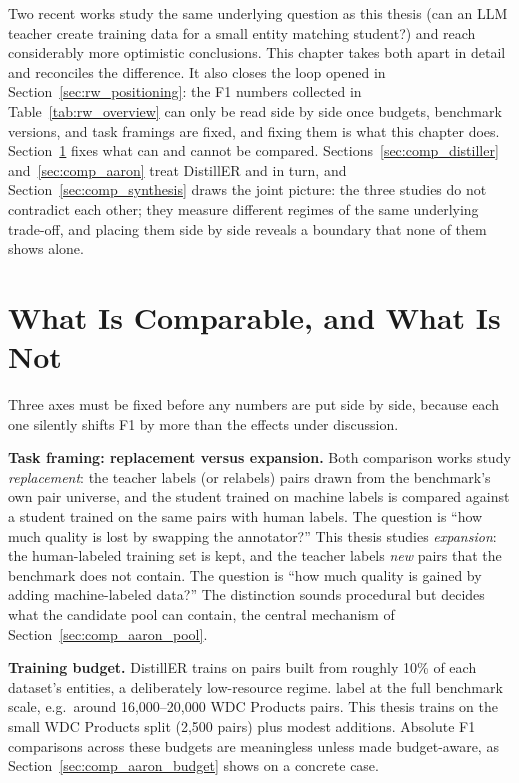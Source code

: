 \documentclass[a4paper,oneside,bibliography=totoc]{scrbook}
\begin{document}
Two recent works study the same underlying question as this thesis (can an LLM teacher create training data for a small entity matching student?) and reach considerably more optimistic conclusions. This chapter takes both apart in detail and reconciles the difference. It also closes the loop opened in Section~\ref{sec:rw_positioning}: the F1 numbers collected in Table~\ref{tab:rw_overview} can only be read side by side once budgets, benchmark versions, and task framings are fixed, and fixing them is what this chapter does. Section~\ref{sec:comp_framework} fixes what can and cannot be compared. Sections~\ref{sec:comp_distiller} and~\ref{sec:comp_aaron} treat DistillER \cite{zeakis2026distiller} and \citet{steiner2026labeling} in turn, and Section~\ref{sec:comp_synthesis} draws the joint picture: the three studies do not contradict each other; they measure different regimes of the same underlying trade-off, and placing them side by side reveals a boundary that none of them shows alone.

\section{What Is Comparable, and What Is Not}
\label{sec:comp_framework}

Three axes must be fixed before any numbers are put side by side, because each one silently shifts F1 by more than the effects under discussion.

\textbf{Task framing: replacement versus expansion.} Both comparison works study \emph{replacement}: the teacher labels (or relabels) pairs drawn from the benchmark's own pair universe, and the student trained on machine labels is compared against a student trained on the same pairs with human labels. The question is ``how much quality is lost by swapping the annotator?'' This thesis studies \emph{expansion}: the human-labeled training set is kept, and the teacher labels \emph{new} pairs that the benchmark does not contain. The question is ``how much quality is gained by adding machine-labeled data?'' The distinction sounds procedural but decides what the candidate pool can contain, the central mechanism of Section~\ref{sec:comp_aaron_pool}.

\textbf{Training budget.} DistillER trains on pairs built from roughly 10\% of each dataset's entities, a deliberately low-resource regime. \citet{steiner2026labeling} label at the full benchmark scale, e.g.\ around 16{,}000--20{,}000 WDC Products pairs. This thesis trains on the small WDC Products split (2{,}500 pairs) plus modest additions. Absolute F1 comparisons across these budgets are meaningless unless made budget-aware, as Section~\ref{sec:comp_aaron_budget} shows on a concrete case.
\end{document}
